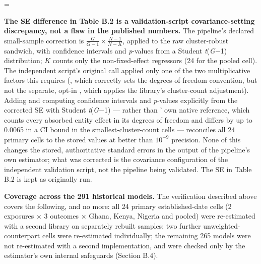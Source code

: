 \begingroup\edef\ThesisSavedIndent{\the\parindent}\raggedright\parindent=\ThesisSavedIndent\relax{}

\textbf{The SE difference in Table B.2 is a validation-script covariance-setting discrepancy, not a flaw in the published numbers.} The pipeline's declared small-sample correction is \(\frac{G}{G-1}\times\frac{N-1}{N-K}\), applied to the raw cluster-robust sandwich, with confidence intervals and \emph{p}-values from a Student \emph{t}(\emph{G}−1) distribution; \(K\) counts only the non-fixed-effect regressors (24 for the pooled cell). The independent script's original  call applied only one of the two multiplicative factors this requires (, which correctly sets the degrees-of-freedom convention, but not the separate, opt-in , which applies the library's cluster-count adjustment). Adding  and computing confidence intervals and \emph{p}-values explicitly from the corrected SE with Student \emph{t}(\emph{G}−1) --- rather than ' own native reference, which counts every absorbed entity effect in its degrees of freedom and differs by up to 0.0065 in a CI bound in the smallest-cluster-count cells --- reconciles all 24 primary cells to the stored values at better than \(10^{-9}\) precision. None of this changes the stored, authoritative standard errors in the output of the pipeline's own estimator; what was corrected is the covariance configuration of the independent validation script, not the pipeline being validated. The SE in Table B.2 is kept as originally run.

\par\endgroup

\textbf{Coverage across the 291 historical models.} The verification described above covers the following, and no more: all 24 primary established-date cells (2 exposures × 3 outcomes × Ghana, Kenya, Nigeria and pooled) were re-estimated with a second library on separately rebuilt samples; two further unweighted-counterpart cells were re-estimated individually; the remaining 265 models were not re-estimated with a second implementation, and were checked only by the estimator's own internal safeguards (Section B.4).

